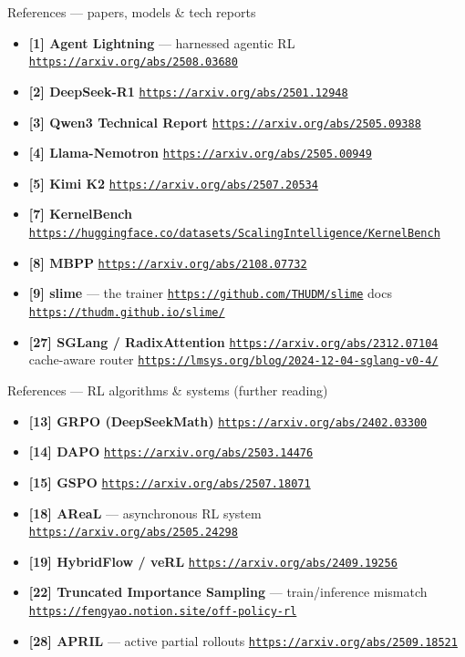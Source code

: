 \newcommand{\rurl}[1]{\href{#1}{\textcolor{linkc}{\scriptsize\nolinkurl{#1}}}}
\begin{frame}{References --- papers, models \& tech reports}
\begin{itemize}\footnotesize\setlength{\itemsep}{1.3mm}
\item \textbf{[1] Agent Lightning} --- harnessed agentic RL \textperiodcentered{} \rurl{https://arxiv.org/abs/2508.03680}
\item \textbf{[2] DeepSeek-R1} \textperiodcentered{} \rurl{https://arxiv.org/abs/2501.12948}
\item \textbf{[3] Qwen3 Technical Report} \textperiodcentered{} \rurl{https://arxiv.org/abs/2505.09388}
\item \textbf{[4] Llama-Nemotron} \textperiodcentered{} \rurl{https://arxiv.org/abs/2505.00949}
\item \textbf{[5] Kimi K2} \textperiodcentered{} \rurl{https://arxiv.org/abs/2507.20534}
\item \textbf{[7] KernelBench} \textperiodcentered{} \rurl{https://huggingface.co/datasets/ScalingIntelligence/KernelBench}
\item \textbf{[8] MBPP} \textperiodcentered{} \rurl{https://arxiv.org/abs/2108.07732}
\item \textbf{[9] slime} --- the trainer \textperiodcentered{} \rurl{https://github.com/THUDM/slime} \textperiodcentered{} docs \rurl{https://thudm.github.io/slime/}
\item \textbf{[27] SGLang / RadixAttention} \textperiodcentered{} \rurl{https://arxiv.org/abs/2312.07104} \textperiodcentered{} cache-aware router \rurl{https://lmsys.org/blog/2024-12-04-sglang-v0-4/}
\end{itemize}
\end{frame}

\begin{frame}{References --- RL algorithms \& systems (further reading)}
\begin{itemize}\footnotesize\setlength{\itemsep}{1.6mm}
\item \textbf{[13] GRPO (DeepSeekMath)} \textperiodcentered{} \rurl{https://arxiv.org/abs/2402.03300}
\item \textbf{[14] DAPO} \textperiodcentered{} \rurl{https://arxiv.org/abs/2503.14476}
\item \textbf{[15] GSPO} \textperiodcentered{} \rurl{https://arxiv.org/abs/2507.18071}
\item \textbf{[18] AReaL} --- asynchronous RL system \textperiodcentered{} \rurl{https://arxiv.org/abs/2505.24298}
\item \textbf{[19] HybridFlow / veRL} \textperiodcentered{} \rurl{https://arxiv.org/abs/2409.19256}
\item \textbf{[22] Truncated Importance Sampling} --- train/inference mismatch \textperiodcentered{} \rurl{https://fengyao.notion.site/off-policy-rl}
\item \textbf{[28] APRIL} --- active partial rollouts \textperiodcentered{} \rurl{https://arxiv.org/abs/2509.18521}
\end{itemize}
\end{frame}

